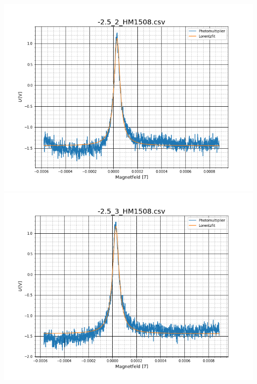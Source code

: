 \begin{center}
\includegraphics[scale=0.3]{Bild/Anhang/Statistik/stat3}
\includegraphics[scale=0.3]{Bild/Anhang/Statistik/stat4}\\


\end{center}
